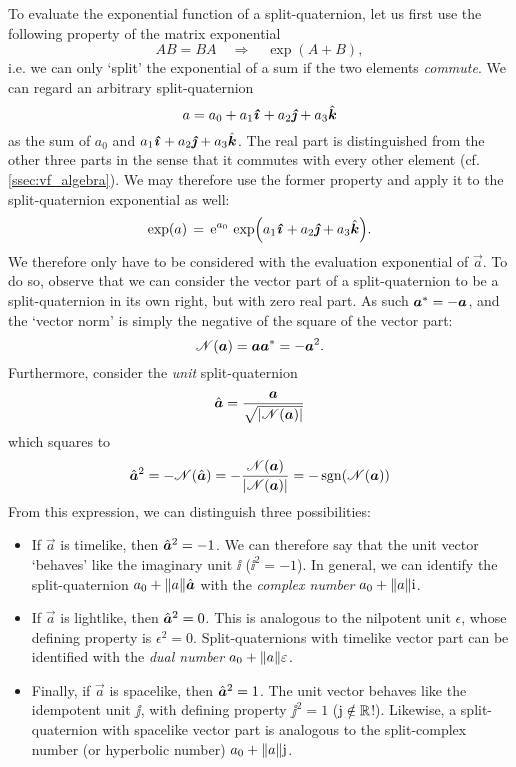 To evaluate the exponential function of a split-quaternion, let us first use the following property of the matrix exponential \cite{Hall2013}
$$ AB = BA \quad \Rightarrow \quad \exp(A + B), $$
i.e. we can only `split' the exponential of a sum if the two elements \emph{commute}. We can regard an arbitrary split-quaternion
$$ a = \quat{a_0}{a_1}{a_2}{a_3} $$
as the sum of $a_0$ and $\quatvec{a_1}{a_2}{a_3}$. The real part is distinguished from the other three parts in the sense that it commutes
with every other element (cf. \cref{ssec:vf_algebra}). We may therefore use the former property and apply it to the split-quaternion exponential as well:
$$ \exp(a) \, = \,\ec^{a_0}\,\exp(\quatvec{a_1}{a_2}{a_3}). $$
We therefore only have to be considered with the evaluation exponential of $\vec{a}$. To do so, observe that we can consider the vector part of a split-quaternion to be a split-quaternion in its own right, but with zero real part. As such $ \conj{\vec{a}} = -\vec{a} $, and the `vector norm' is simply the negative of the square of the vector part:
$$ \mathscr{N}(\vec{a}) = \vec{a} \conj{\vec{a}} = -\vec{a}^2. $$
Furthermore, consider the \emph{unit} split-quaternion
$$ \hat{\vec{a}} = \frac{\vec{a}}{\sqrt{\abs{\mathscr{N}(\vec{a})}}} $$
which squares to
$$ \hat{\vec{a}}^2 = - \mathscr{N}(\hat{\vec{a}}) 
                   = - \frac{\mathscr{N}(\vec{a})}{\abs{\mathscr{N}(\vec{a})}} 
                   = - \sgn(\mathscr{N}(\vec{a}))
$$
From this expression, we can distinguish three possibilities: \cite{Motter1998,Harkin2004}
\begin{itemize}
    \item If $\vec{a}$ is timelike, then $\uvec{a}^2 = -1$. We can therefore say that the unit vector `behaves' like the imaginary unit $\ii$ ($\ii^2 = -1$). In general, we can identify the split-quaternion $ a_0 + \norm{a}\uvec{a}$ with the \emph{complex number} $a_0 + \norm{a}\mathrm{i}$. 
    \item If $\vec{a}$ is lightlike, then $\uvec{a}^2 = 0$. This is analogous to the nilpotent unit $\epsilon$, whose defining property is $ \epsilon^2 = 0$. Split-quaternions with timelike vector part can be identified with the \emph{dual number} $a_0 + \norm{a}\varepsilon$. 
    \item Finally, if $\vec{a}$ is spacelike, then $\uvec{a}^2 = 1$. The unit vector behaves like the idempotent unit $\jj$, with defining property $\jj^2 = 1$ ($\mathrm{j} \notin \mathbb{R}$!). Likewise, a split-quaternion with spacelike vector part is analogous to the split-complex number (or hyperbolic number) $a_0 + \norm{a}\mathrm{j}$.
\end{itemize}


